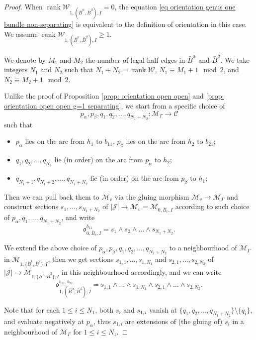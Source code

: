 \documentclass[11pt,a4paper]{article}
\theoremstyle{definition}
\theoremstyle{remark}
\numberwithin{equation}{section}
\begin{document}
\begin{proof}
    
    When $\operatorname{rank} \mathcal W_{1,(\bar{B}^\alpha,\bar{B}^\beta),I}=0$, the equation \eqref{eq orientation genus one bundle non-separating} is equivalent to the definition of orientation in this case. We assume $\operatorname{rank} \mathcal W_{1,(\bar{B}^\alpha,\bar{B}^\beta),I}\ge 1$.

    We denote by $M_1$ and $M_2$ the number of legal half-edges in $\bar B^\alpha$ and $\bar B^\beta$.
    We take integers $N_1$ and $N_2$ such that $N_1+N_2=\operatorname{rank} \mathcal W$, $N_1\equiv M_1 +1 \mod 2$, and $N_2 \equiv M_2 +1 \mod 2$.

    Unlike the proof of Proposition \ref{prop: orientation open open} and \ref{prop: orientation open open g=1 separating}, we start from a specific choice of $$p_\alpha,p_\beta,q_1,q_2,\dots,q_{N_1+N_2}\colon \mathcal M_\Gamma \to \mathcal C$$ such that 
    \begin{itemize}
        \item $p_\alpha$ lies on the arc from $h_1$ to $b_{11}$, $p_\beta$ lies on the arc from $h_2$ to $b_{21}$;
        \item $q_{1},q_{2},\dots,q_{N_1}$ lie (in order) on the arc from $p_\alpha$ to $h_2$;
        \item $q_{N_1+1},q_{N_1+2},\dots,q_{N_1+N_2}$ lie (in order) on the arc from $p_\beta$ to $h_1$;
    \end{itemize}  
    Then we can pull back them to $\mathcal M_v$ via the gluing morphism $\mathcal M_v\to \mathcal M_{\Gamma}$ and construct sections $s_1,\dots,s_{N_1+N_2}$ of $\lvert \mathcal J \rvert \to \mathcal M_v=\mathcal M_{0,\bar B_v,I}$ according to such choice of $p_\alpha,q_1,\dots,q_{N_1+N_2}$, and write 
    $${\mathfrak{o}}^{b_{11}}_{0,\bar B_v,I}=s_1\wedge s_2 \wedge \dots \wedge s_{N_1+N_2}.$$

    We extend the above choice of $p_\alpha,p_\beta,q_1,q_2,\dots,q_{N_1+N_2}$ to a neighbourhood of $\mathcal{M}_\Gamma$ in $\mathcal M_{1,\{\bar{B}^1,\bar{B}^2\},I}$, then we get sections $s_{1,1},\dots,s_{1,N_1}$ and $s_{2,1},\dots, s_{2,N_2}$ of $\lvert \mathcal J \rvert \to \mathcal M_{1,\{\bar{B}^1,\bar{B}^2\},I}$ in this neighbourhood accordingly, and we can write
    $$
    {\mathfrak{o}}^{b_{11},b_{21}}_{1,(\bar{B}^\alpha,\bar{B}^\beta),I}=s_{1,1}\wedge\dots \wedge s_{1,N_1} \wedge s_{2,1}\wedge \dots \wedge s_{2, N_2}.
    $$

    Note that for each $1\le i \le N_1$, both $s_i$ and $s_{1,i}$ vanish at $\{q_1,q_2,\dots,q_{N_1+N_2}\}\setminus \{q_i\}$, and evaluate negatively at $p_\alpha$, thus $s_{1,i}$ are extensions of (the gluing of) $s_i$ in a neighbourhood of $\mathcal M_\Gamma$ for $1\le i \le N_1$.


\end{proof}
\end{document}
